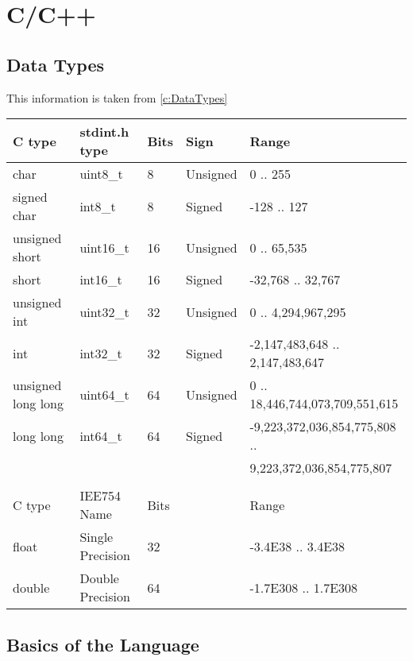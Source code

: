 \chapter{C/C++}
\thispagestyle{fancy}
\lstset{language=C++, style=cpp}

\section{Data Types}

\begin{fancybox}{}	
	This information is taken from \ref{c:DataTypes}
	\begin{center}
		\begin{tabular}{l|l|l|l|l}
			C type & stdint.h type & Bits & Sign & Range\\
			\hline
			char & uint8\_t & 8 & Unsigned & 0 .. 255 \\
			signed char & int8\_t & 8 & Signed & -128 .. 127 \\
			unsigned short & uint16\_t & 16 & Unsigned & 0 .. 65,535 \\
			short & int16\_t & 16 & Signed & -32,768 .. 32,767 \\
			unsigned int & uint32\_t & 32 & Unsigned & 0 .. 4,294,967,295 \\
			int & int32\_t & 32 & Signed & -2,147,483,648 .. 2,147,483,647 \\
			unsigned long long & uint64\_t & 64 & Unsigned & 0 .. 18,446,744,073,709,551,615 \\
			long long & int64\_t & 64 & Signed & -9,223,372,036,854,775,808 .. \\ & & & & \hspace{2em} 9,223,372,036,854,775,807 \\
			& & & & \\
			C type & IEE754 Name & Bits & & Range \\
			\hline
			float & Single Precision & 32 & & -3.4E38 .. 3.4E38 \\
			double & Double Precision & 64 & & -1.7E308 .. 1.7E308
		\end{tabular}
	\end{center}
\end{fancybox}




\section{Basics of the Language}

